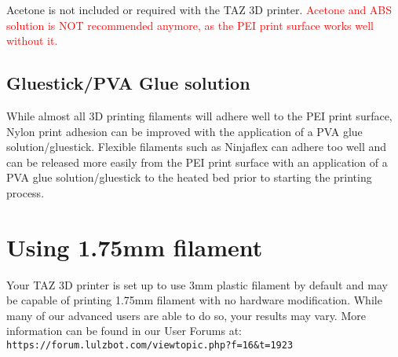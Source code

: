 Acetone is not included or required with the TAZ 3D printer. \textcolor{red}{Acetone and ABS solution is NOT recommended anymore, as the PEI print surface works well without it.}

\subsection{Gluestick/PVA Glue solution}
\label{sec:Gluestick/PVA Glue solution}
 While almost all 3D printing filaments will adhere well to the PEI print surface, Nylon print adhesion can be improved with the application of a PVA glue solution/gluestick. Flexible filaments such as Ninjaflex can adhere too well and can be released more easily from the PEI print surface with an application of a PVA glue solution/gluestick to the heated bed prior to starting the printing process.


\section{Using 1.75mm filament}

Your TAZ 3D printer is set up to use 3mm plastic filament by default and may be capable of printing 1.75mm filament with no hardware modification. While many of our advanced users are able to do so, your results may vary.  More information can be found in our User Forums at: \texttt{https://forum.lulzbot.com/viewtopic.php?f=16\&t=1923} 
